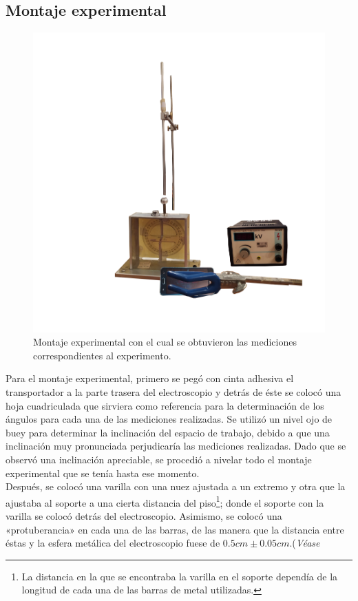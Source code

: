 \documentclass[10pt,journal]{IEEEtran}
\begin{document}
\subsection{Montaje experimental}
\begin{figure}
\begin{flushleft}
\includegraphics[scale=0.3]{Figuras/Montaje_experimental.png}
\caption{Montaje experimental con el cual se obtuvieron las mediciones correspondientes al experimento.}
\label{Fig: Montaje}
\end{flushleft}
\end{figure}
Para el montaje experimental, primero se pegó con cinta adhesiva el transportador a la parte trasera del electroscopio y detrás de éste se colocó una hoja cuadriculada que sirviera como referencia para la determinación de los ángulos para cada una de las mediciones realizadas. Se utilizó un nivel ojo de buey para determinar la inclinación del espacio de trabajo, debido a que una inclinación muy pronunciada perjudicaría las mediciones realizadas. Dado que se observó una inclinación apreciable, se procedió a nivelar todo el montaje experimental que se tenía hasta ese momento.\\
Después, se colocó una varilla con una nuez ajustada a un extremo y otra que la ajustaba al soporte a una cierta distancia del piso\footnote{La distancia en la que se encontraba la varilla en el soporte dependía de la longitud de cada una de las barras de metal utilizadas.}; donde el soporte con la varilla se colocó detrás del electroscopio. Asimismo, se colocó una «protuberancia» en cada una de las barras, de las manera que la distancia entre éstas y la esfera metálica del electroscopio fuese de $0.5cm \pm 0.05 cm$.(\textit{Véase} 
\end{document}
